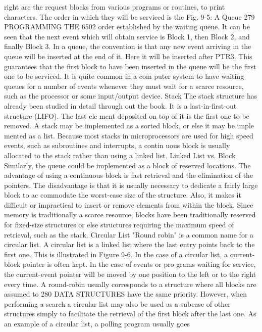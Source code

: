 {right are the request blocks from various programs or routines, to
print characters. The order in which they will be serviced is the
Fig. 9-5: A Queue
279
PROGRAMMING THE 6502
order established by the waiting queue. It can be seen that the
next event which will obtain service is Block 1, then Block 2, and finally
Block 3. In a queue, the convention is that any new event arriving in the
queue will be inserted at the end of it. Here it will be inserted after
PTR3. This guarantees that the first block to have been inserted in the
queue will be the first one to be serviced. It is quite common in a com
puter system to have waiting queues for a number of events whenever
they must wait for a scarce resource, such as the processor or some
input/output device.
Stack
The stack structure has already been studied in detail through
out the book. It is a last-in-first-out structure (LIFO). The last ele
ment deposited on top of it is the first one to be removed. A stack
may be implemented as a sorted block, or else it may be imple
mented as a list. Because most stacks in microprocessors are used
for high speed events, such as subroutines and interrupts, a contin
uous block is usually allocated to the stack rather than using a
linked list.
Linked List vs. Block
Similarly, the queue could be implemented as a block of reserved
locations. The advantage of using a continuous block is fast
retrieval and the elimination of the pointers. The disadvantage is
that it is usually necessary to dedicate a fairly large block to ac
commodate the worst-case size of the structure. Also, it makes it
difficult or impractical to insert or remove elements from within
the block. Since memory is traditionally a scarce resource, blocks
have been traditionally reserved for fixed-size structures or else
structures requiring the maximum speed of retrieval, such as the
stack.
Circular List
"Round robin" is a common name for a circular list. A circular
list is a linked list where the last entry points back to the first one.
This is illustrated in Figure 9-6. In the case of a circular list, a
current-block pointer is often kept. In the case of events or pro
grams waiting for service, the current-event pointer will be moved
by one position to the left or to the right every time. A round-robin
usually corresponds to a structure where all blocks are assumed to
280
DATA STRUCTURES
have the same priority. However, when performing a search a circular
list may also be used as a subcase of other structures simply to facilitate
the retrieval of the first block after the last one.
As an example of a circular list, a polling program usually goes
}
